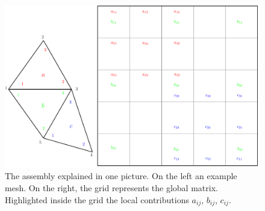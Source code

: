 \documentclass[11pt]{amsart}
\begin{document}
\begin{figure}[h]
\centering
\includegraphics[scale=.8]{assembly-pics.pdf}
\caption{The assembly explained in one picture. On the left an example 
mesh. On the right, the grid represents the global matrix. Highlighted inside the 
grid the local contributions $a_{ij}$, $b_{ij}$, $c_{ij}$.}
\label{fig:assembly}
\end{figure}
\end{document}

